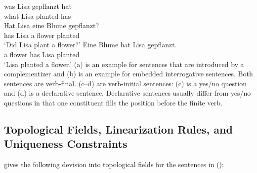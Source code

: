 \ex 
\gll was Lisa  gepflanzt hat\\
     what Lisa planted has\\
\ex
\gll Hat Lisa eine Blume gepflanzt?\\
     has Lisa a flower planted\\
\glt `Did Lisa plant a flower?'
\ex 
\gll Eine Blume hat Lisa gepflanzt.\\
     a flower   has Lisa planted\\
\glt `Lisa planted a flower.'
\zl
(a) is an example for sentences that are introduced by a complementizer
and (b) is an example for embedded interrogative sentences. Both sentences
are verb-final. (c--d) are verb-initial sentences: (c) is a yes/no question
and (d) is a declarative sentence. Declarative sentences usually differ from
yes/no questions in that one constituent fills the position before the finite
verb.

\subsection{Topological Fields, Linearization Rules, and Uniqueness Constraints}


\citet[p.\,50]{Kathol2001a} gives the following devision into topological fields
for the sentences in ():
\begin{table*}[htbp]
\end{table*}

